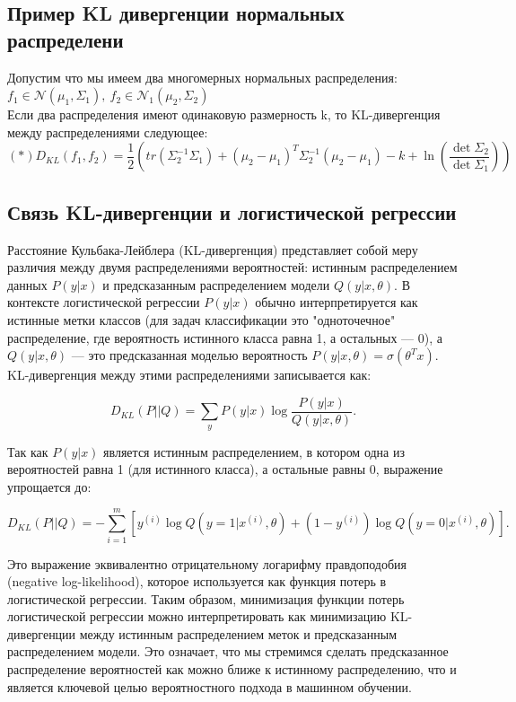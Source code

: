 \subsection*{Пример KL дивергенции нормальных распределени}
Допустим что мы имеем два многомерных нормальных распределения: $f_1 \in \mathcal{N}(\mu_1, \Sigma_1), \ f_2 \in \mathcal{N}_1(\mu_2, \Sigma_2)$
\\ 
Если два распределения имеют одинаковую размерность k, то KL-дивергенция между распределениями следующее:
\[ (*)
D_{KL}(f_1, f_2) = \frac{1}{2} (tr (\Sigma_2^{-1} \Sigma_1) + (\mu_2 - \mu_1)^T\Sigma_2^{-1}(\mu_2 - \mu_1) - k + \ln\left( \frac{\det \Sigma_2}{\det \Sigma_1} \right) )
\]

\subsection*{Связь KL-дивергенции и логистической регрессии}
Расстояние Кульбака-Лейблера (KL-дивергенция) представляет собой меру различия между двумя распределениями вероятностей: истинным распределением данных $P(y|x)$ и предсказанным распределением модели  $Q(y|x, \theta)$. В контексте логистической регрессии $P(y|x)$ обычно интерпретируется как истинные метки классов (для задач классификации это "одноточечное" 
распределение, где вероятность истинного класса равна 1, а остальных — 0), а $Q(y|x, \theta)$ — это предсказанная моделью вероятность $P(y|x, \theta) = \sigma(\theta^T x)$. KL-дивергенция между этими распределениями записывается как:

\[
D_{KL}(P || Q) = \sum_{y} P(y|x) \log \frac{P(y|x)}{Q(y|x, \theta)}.
\]

Так как $P(y|x)$ является истинным распределением, в котором одна из вероятностей равна 1 (для истинного класса), а остальные равны 0, выражение упрощается до:

\[
D_{KL}(P || Q) = - \sum_{i=1}^m \left[ y^{(i)} \log Q(y=1|x^{(i)}, \theta) + (1 - y^{(i)}) \log Q(y=0|x^{(i)}, \theta) \right].
\]

Это выражение эквивалентно отрицательному логарифму правдоподобия (negative log-likelihood), которое используется как функция потерь в логистической регрессии. Таким образом, минимизация функции потерь логистической регрессии можно интерпретировать как минимизацию KL-дивергенции между истинным распределением меток и предсказанным распределением модели. Это означает, что мы стремимся сделать предсказанное распределение вероятностей как можно ближе к истинному распределению, что и является ключевой целью вероятностного подхода в машинном обучении.


